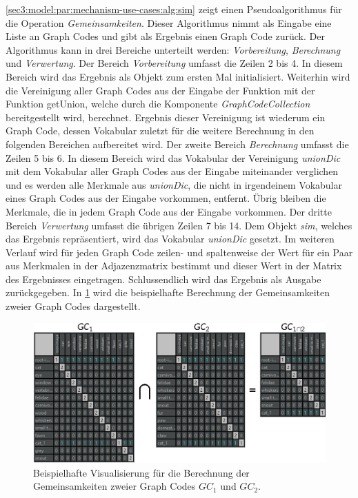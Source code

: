 \cref{sec3:model:par:mechanism-use-cases:alg:sim} zeigt einen Pseudoalgorithmus für die Operation \textit{Gemeinsamkeiten}.
Dieser Algorithmus nimmt als Eingabe eine Liste an Graph Codes und gibt als Ergebnis einen Graph Code zurück.
Der Algorithmus kann in drei Bereiche unterteilt werden: \textit{Vorbereitung}, \textit{Berechnung} und \textit{Verwertung}.
Der Bereich \textit{Vorbereitung} umfasst die Zeilen 2 bis 4.
In diesem Bereich wird das Ergebnis als Objekt zum ersten Mal initialisiert.
Weiterhin wird die Vereinigung aller Graph Codes aus der Eingabe der Funktion mit der Funktion getUnion, welche durch die Komponente \textit{GraphCodeCollection} bereitgestellt wird, berechnet.
Ergebnis dieser Vereinigung ist wiederum ein Graph Code, dessen Vokabular zuletzt für die weitere Berechnung in den folgenden Bereichen aufbereitet wird.
Der zweite Bereich \textit{Berechnung} umfasst die Zeilen 5 bis 6.
In diesem Bereich wird das Vokabular der Vereinigung \textit{unionDic} mit dem Vokabular aller Graph Codes aus der Eingabe miteinander verglichen und es werden alle Merkmale aus \textit{unionDic}, die nicht in irgendeinem Vokabular eines Graph Codes aus der Eingabe vorkommen, entfernt.
Übrig bleiben die Merkmale, die in jedem Graph Code aus der Eingabe vorkommen.
Der dritte Bereich \textit{Verwertung} umfasst die übrigen Zeilen 7 bis 14.
Dem Objekt \textit{sim}, welches das Ergebnis repräsentiert, wird das Vokabular \textit{unionDic} gesetzt.
Im weiteren Verlauf wird für jeden Graph Code zeilen- und spaltenweise der Wert für ein Paar aus Merkmalen in der Adjazenzmatrix bestimmt und dieser Wert in der Matrix des Ergebnisses eingetragen.
Schlussendlich wird das Ergebnis als Ausgabe zurückgegeben.
In \cref{sec3:model:par:mechanism-use-cases:fig:gc1-2-similarities} wird die beispielhafte Berechnung der Gemeinsamkeiten zweier Graph Codes dargestellt.

\begin{figure}[!ht]
  \centering
  \includegraphics{chapter/chapter_3/algorithms/gc1-2-similarities-ex}
  \caption{Beispielhafte Visualisierung für die Berechnung der Gemeinsamkeiten zweier Graph Codes $GC_1$ und $GC_2$.}
  \label{sec3:model:par:mechanism-use-cases:fig:gc1-2-similarities}
\end{figure}

